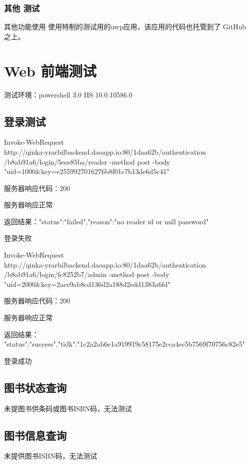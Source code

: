 \documentclass[UTF8]{report}
\begin{document}
    \subsection{其他 测试}
    其他功能使用 使用特制的测试用的uwp应用，该应用的代码也托管到了 GitHub 之上。
    \chapter{Web 前端测试}
    测试环境：powershell 3.0 IIS 10.0.10586.0
    \section{登录测试}
    Invoke-WebRequest \\
    http://qinka-yrarbilbackend.daoapp.io:80/1daa62b/authentication \\
    /b8ab91a6/login/5ece85ba/reader -method post -body \\ "uid=1000\&key=e2559927016276b8f01e7b13de6d5c41"
    \par 服务器响应代码：200
    \par 服务器响应正常
    \par 返回结果：{"status":"failed","reason":"no reader id or null password"}
    \par  登录失败
    
    Invoke-WebRequest \\ http://qinka-yrarbilbackend.daoapp.io:80/1daa62b/authentication \\
    /b8ab91a6/login/fc8252b7/admin -method post -body \\
    "uid=2000\&key=2ace9ab8cd136d2a188d2edd1383a6fd"
    \par 服务器响应代码：200
    \par 服务器响应正常
    \par 返回结果：
    {"status":"success","tidk":"1c2a2ab6e1a919919c58175e2cca4ec5b7569f70756c82e5"}
    \par 登录成功
    
    \section{图书状态查询}
    未提图书供条码或图书ISBN码，无法测试
    
    \section{图书信息查询}
    未提供图书ISBN码，无法测试
    
\end{document}
